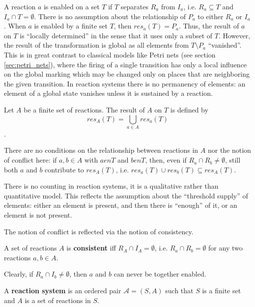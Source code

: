 
A reaction $a$ is enabled on a set $T$ if $T$ separates $R_a$ from $I_a$, i.e. $R_a\subseteq T$ and $I_a\cap T = \emptyset$. There is no assumption about the relationship of $P_a$ to either $R_a$ or $I_a$. When $a$ is enabled by a finite set $T$, then $res_a(T) = P_a$. Thus, the result of $a$ on $T$ is ``locally determined'' in the sense that it uses only a subset of $T$. However, the result of the transformation is global as all elements from $T \setminus P_a$ ``vanished''. This is in great contrast to classical models like Petri nets (see section \ref{sec:petri_nets}), where the firing of a single transition has only a local influence on the global marking which may be changed only on places that are neighboring the given transition. In reaction systems there is no permanency of elements: an element of a global state vanishes unless it is sustained by a reaction.

\begin{definition}
  Let $A$ be a finite set of reactions. The result of $A$ on $T$ is defined by $$res_A(T) = \bigcup_{a\in A} res_a(T)$$.
\end{definition}

There are no conditions on the relationship between reactions in $A$ nor the notion of conflict here: if $a,b\in A$ with $a \mathrel{en} T$ and $b \mathrel{en} T$, then, even if $R_a\cap R_b\neq\emptyset$, still both $a$ and $b$ contribute to $res_A(T)$, i.e. $res_a(T)\cup res_b(T) \subseteq res_A(T)$.

There is no counting in reaction systems, it is a qualitative rather than quantitative model. This reflects the assumption about the ``threshold supply'' of elements: either an element is present, and then there is ``enough'' of it, or an element is not present.

The notion of conflict is reflected via the notion of consistency.

\begin{definition}
  A set of reactions $A$ is {\bf consistent} iff $R_A\cap I_A = \emptyset$, i.e. $R_a\cap R_b = \emptyset$ for any two reactions $a,b \in A$.
\end{definition}

Clearly, if $R_a\cap I_b\neq\emptyset$, then $a$ and $b$ can never be together enabled.

\begin{definition}
  A {\bf reaction system} is an ordered pair $\mathcal{A} = (S, A)$ such that $S$ is a finite set and $A$ is a set of reactions in $S$.
\end{definition}


